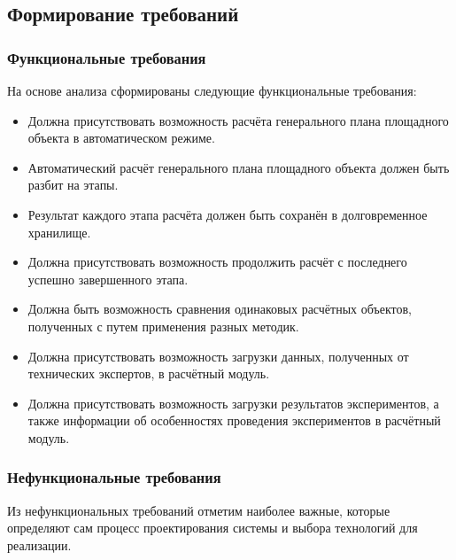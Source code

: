 \subsection{\Large{Формирование требований}}

\subsubsection{\large{Функциональные требования}}

На основе анализа сформированы следующие функциональные требования:
\begin{itemize}
    \item {
        Должна присутствовать возможность расчёта генерального плана площадного объекта в автоматическом режиме.
    }
    \item {
        Автоматический расчёт генерального плана площадного объекта должен быть разбит на этапы.
    }
    \item {
        Результат каждого этапа расчёта должен быть сохранён в долговременное хранилище.
    }
    \item {
        Должна присутствовать возможность продолжить расчёт с последнего успешно завершенного этапа.
    }
    \item {
        Должна быть возможность сравнения одинаковых расчётных объектов, полученных с путем применения разных методик.
    }
    \item {
        Должна присутствовать возможность загрузки данных, полученных от технических экспертов, в расчётный модуль.
    }
    \item {
        Должна присутствовать возможность загрузки результатов экспериментов, а также информации об особенностях
        проведения экспериментов в расчётный модуль.
    }
\end{itemize}

\subsubsection{\large{Нефункциональные требования}}

Из нефункциональных требований отметим наиболее важные, которые определяют сам процесс проектирования системы
и выбора технологий для реализации.

